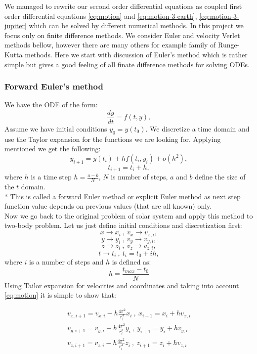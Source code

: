 \documentclass[10pt]{article}
\begin{document}
We managed to rewrite our second order differential equations as coupled first order differential equations \ref{eq:motion} and \ref{eq:motion-3-earth}, \ref{eq:motion-3-jupiter} which can be solved by different numerical methods. In this project we focus only on finite difference methods. We consider Euler and velocity Verlet methods bellow, however there are many others for example family of Runge-Kutta methods.
Here we start with discussion of Euler's method which is rather simple but gives a good feeling of all finate difference methods for solving ODEs.\\
\subsubsection{Forward Euler's method}

We have the ODE of the form: 
\[
\frac{dy}{dt}=f(t,y),
\] 
Assume we have initial conditions $y_0 = y(t_0)$. We discretize a time domain and use the Taylor expansion for the functions we are looking for. 
Applying mentioned we get the following:
\[ 
y_{i+1}=y(t_i)+hf(t_i,y_i)+o(h^2),
\]
\[
t_{i+1}=t_i+h,
\]
where $h$ is a time step $h=\frac{a-b}{N}$, $N$ is number of steps, $a$ and $b$ define the size of the $t$ domain.\\*
This is called a forward Euler method or explicit Euler method as next step function value depends on previous values (that are all known) only.\\
Now we go back to the original problem of solar system and apply this method to two-body problem. Let us just define initial conditions and discretization first:
\[
x \rightarrow x_i \ ,\ v_x \rightarrow v_{x,i},
\]
\[
y \rightarrow y_i \ ,\ v_y \rightarrow v_{y,i},
\]
\[
z \rightarrow z_i \ ,\ v_z \rightarrow v_{z,i},
\]
\[
t \rightarrow t_i \ ,\ t_i = t_0 + ih,
\]
where $i$ is a number of steps and $h$ is defined as:
\[
h = \frac{t_{max}-t_0}{N}
\]
Using Tailor expansion for velocities and coordinates and taking into account \ref{eq:motion} it is simple to show that: 

\begin{equation}\label{eq:euler-two-body}
\begin{aligned} 
v_{x,i+1}=v_{x,i}-h\frac{4\pi^2}{r_i^3}x_i \ ,\ x_{i+1}=x_{i}+hv_{x,i}\\
v_{y,i+1}=v_{y,i}-h\frac{4\pi^2}{r_i^3}y_i \ ,\ y_{i+1}=y_{i}+hv_{y,i}\\
v_{z,i+1}=v_{z,i}-h\frac{4\pi^2}{r_i^3}z_i \ ,\ z_{i+1}=z_{i}+hv_{z,i}\\
\end{aligned}
\end{equation}
\end{document}
